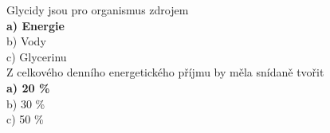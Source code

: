 \begin{multicols}{\value{columnsthindata}}
\noindent
Glycidy jsou pro organismus zdrojem\\
\textbf{a) Energie}\\
b) Vody\\
c) Glycerinu\\

\noindent
Z celkového denního energetického příjmu by měla snídaně tvořit\\
\textbf{a) 20 \%}\\
b) 30 \%\\
c) 50 \%\\

\end{multicols}
\clearpage

